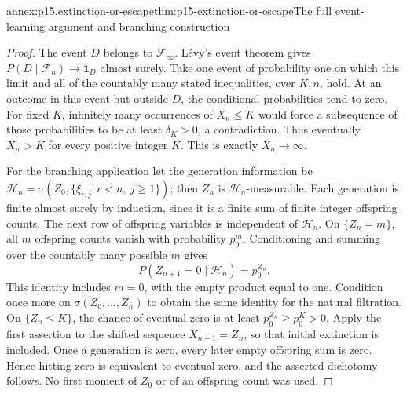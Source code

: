 \begin{annexitem}{annex:p15.extinction-or-escape}{thm:p15-extinction-or-escape}{The full event-learning argument and branching construction}
\begin{proof}
The event \(D\) belongs to \(\mathcal F_\infty\). L\'evy's event theorem
gives \(P(D\mid\mathcal F_n)\to\mathbf1_D\) almost surely.
Take one event of probability one on which this limit and all of the
countably many stated inequalities, over \(K,n\), hold.
At an outcome in this event but outside \(D\), the conditional
probabilities tend to zero. For fixed \(K\), infinitely many occurrences
of \(X_n\leq K\) would force a subsequence of those probabilities to
be at least \(\delta_K>0\), a contradiction. Thus eventually \(X_n>K\)
for every positive integer \(K\). This is exactly \(X_n\to\infty\).

For the branching application let the generation information be
\(\mathcal H_n=\sigma(Z_0,\{\xi_{r,j}:r<n,\ j\geq1\})\);
then \(Z_n\) is \(\mathcal H_n\)-measurable.
Each generation is finite almost surely by induction, since it is a
finite sum of finite integer offspring counts. The next row of offspring
variables is independent of \(\mathcal H_n\). On \(\{Z_n=m\}\),
all \(m\) offspring counts vanish with probability \(p_0^m\).
Conditioning and summing over the countably many possible \(m\) gives
\[
                       P(Z_{n+1}=0\mid\mathcal H_n)=p_0^{Z_n}.
\]
This identity includes \(m=0\), with the empty product equal to one.
Condition once more on \(\sigma(Z_0,\ldots,Z_n)\) to obtain the same
identity for the natural filtration.
On \(\{Z_n\leq K\}\), the chance of eventual zero is at least
\(p_0^{Z_n}\geq p_0^K>0\). Apply the first assertion to the shifted
sequence \(X_{n+1}=Z_n\), so that initial extinction is included.
Once a generation is zero, every later empty offspring sum is zero.
Hence hitting zero is equivalent to eventual zero, and the asserted
dichotomy follows. No first moment of \(Z_0\) or of an offspring count
was used.
\end{proof}
\end{annexitem}

